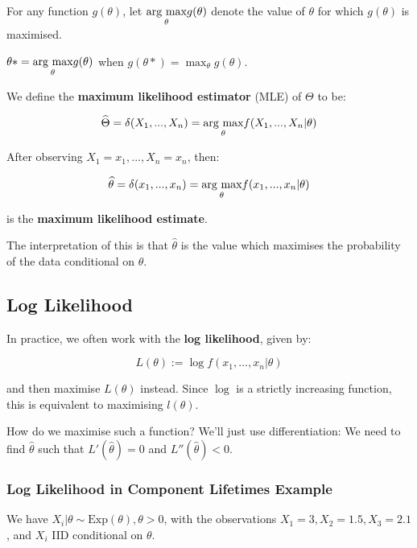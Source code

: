 \documentclass[a4paper]{article}
\begin{document}
        \begin{definition}
            For any function $g(\theta)$, let $\underset{{\theta}}{\text{arg max}} g(\theta)$ denote
            the value of $\theta$ for which $g(\theta)$ is maximised.

            $\theta* = \underset{{\theta}}{\text{arg max}} g(\theta)$ when $g(\theta*) = \max_\theta
            g(\theta)$.

            We define the \textbf{maximum likelihood estimator} (MLE) of
            $\Theta$ to be:

            \[
                \widehat \Theta = \delta(X_1, ..., X_n) = \underset{{\theta}}{\text{arg max}} f(X_1,
                ..., X_n | \theta)
            \]

            After observing $X_1 = x_1, ..., X_n = x_n$, then:

            \[
                \widehat \theta = \delta(x_1, ..., x_n) = \underset{{\theta}}{\text{arg max}} f(x_1,
                ..., x_n | \theta)
            \]

            is the \textbf{maximum likelihood estimate}.
        \end{definition}

        The interpretation of this is that $\widehat \theta$ is the value which
        maximises the probability of the data conditional on $\theta$.

        \subsection{Log Likelihood}
            In practice, we often work with the \textbf{log likelihood}, given
            by:

            \[
                L(\theta) := \log f(x_1, ..., x_n | \theta)
            \]

            and then maximise $L(\theta)$ instead. Since $\log$ is a strictly
            increasing function, this is equivalent to maximising $l(\theta)$.

            How do we maximise such a function? We'll just use differentiation:
            We need to find $\widehat \theta$ such that $L'(\widehat \theta) =
            0$ and $L''(\widehat \theta) < 0$.

            \subsubsection{Log Likelihood in Component Lifetimes Example}
                We have $X_i | \theta \sim \text{Exp}(\theta), \theta > 0$, with
                the observations $X_1 = 3, X_2 = 1.5, X_3 = 2.1$, and $X_i$ IID
                conditional on $\theta$.
\end{document}
